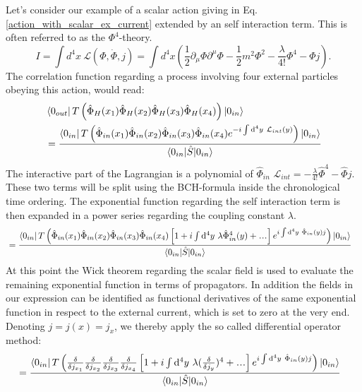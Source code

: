 \documentclass[12pt, titlepage]{article}
\newcommand\mydots{\makebox[1em][c]{.\hfil.\hfil.}}
\begin{document}
Let's consider our example of a scalar action giving in Eq.\enskip\eqref{action_with_scalar_ex_current} extended by an self interaction term. This is often referred to as the $ \Phi^{4}$-theory.
\begin{equation}\label{action_with_scalar_ex_current_self_inter}
I=\int d^{4}x \ \mathcal{L}(\Phi, \dot{\Phi},j)=
\int d^{4}x 
\left(
\frac{1}{2}\partial_{\mu}\Phi\partial^{\mu}\Phi
-\frac{1}{2}m^{2}\Phi^{2}
-\frac{\lambda}{4!}\Phi^{4}
-\Phi j
 \right)
 .
\end{equation} 
The correlation function regarding a process involving four external particles obeying this action, would read:
\begin{equation}
\begin{split}
&\bra{0_{out}}
T\left( 
\hat{\Phi}_{H}(x_1)
\hat{\Phi}_{H}(x_2)
\hat{\Phi}_{H}(x_3)
\hat{\Phi}_{H}(x_4)
\right) 
\ket{0_{in}}
\\
&=\dfrac{
\bra{0_{in}}
T\left( 
\hat{\Phi}_{in}(x_1)
\hat{\Phi}_{in}(x_2)
\hat{\Phi}_{in}(x_3)
\hat{\Phi}_{in}(x_4)
e^{-i\int \mathrm{d}^{4}y\ \mathcal{L}_{int}(y)}
\right)
\ket{0_{in}}
}{\braket{0_{in}|\hat{S}|0_{in}}}
\end{split}
\end{equation}
The interactive part of the Lagrangian is a polynomial of $\hat{\Phi}_{in} $ $ \mathcal{L}_{int} =  -\frac{\lambda}{4!}\hat{\Phi}^{4} -\hat{\Phi} j$. These two terms will be split using the BCH-formula inside the chronological time ordering. The exponential function regarding the self interaction term is then expanded in a power series regarding the coupling constant $ \lambda $. 
\begin{equation}
\begin{split}
&=\dfrac{
\bra{0_{in}}
T\left( 
\hat{\Phi}_{in}(x_1)
\hat{\Phi}_{in}(x_2)
\hat{\Phi}_{in}(x_3)
\hat{\Phi}_{in}(x_4)
\left[ 
1 + 
i\int\mathrm{d}^{4}y\ \lambda\hat{\Phi}_{in}^{4}(y)
+\mydots
\right] 
e^{i\int \mathrm{d}^{4}y\ \hat{\Phi}_{in}(y)j }
\right)
\ket{0_{in}}
}{\braket{0_{in}|\hat{S}|0_{in}}}
\end{split}
\end{equation}
At this point the Wick theorem regarding the scalar field is used to evaluate the remaining exponential function in  terms of propagators. In addition the fields in our expression can be identified as functional derivatives of the same exponential function in respect to the external current, which is set to zero at the very end. Denoting $ j = j(x) = j_{x} $, we thereby apply the so called differential operator method:
\begin{equation}
\begin{split}
&=\dfrac{
\bra{0_{in}}
T\left( 
\frac{\delta}{\delta j_{x_{1}}}
\frac{\delta}{\delta j_{x_{2}}}
\frac{\delta}{\delta j_{x_{3}}}
\frac{\delta}{\delta j_{x_{4}}}
\left[ 
1 + 
i\int\mathrm{d}^{4}y\ \lambda(\frac{\delta}{\delta j_{y}})^{4}
+\mydots
\right] 
e^{i\int \mathrm{d}^{4}y\ \hat{\Phi}_{in}(y)j }
\right)
\ket{0_{in}}
}{\braket{0_{in}|\hat{S}|0_{in}}}
\end{split}
\end{equation}
\end{document}
